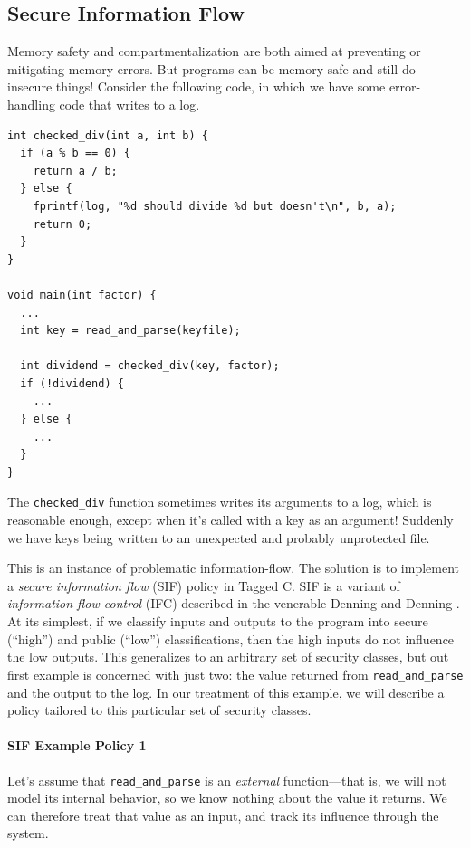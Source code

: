 \documentclass[acmsmall,review,anonymous]{acmart}\settopmatter{printfolios=true,printccs=false,printacmref=false}
\begin{document}
\subsection{Secure Information Flow}
\label{sec:SIF}

Memory safety and compartmentalization are both aimed at preventing or mitigating
memory errors. But programs can be memory safe and still do insecure things! Consider the
following code, in which we have some error-handling code that writes to a log.

\begin{verbatim}
int checked_div(int a, int b) {
  if (a % b == 0) {
    return a / b;
  } else {
    fprintf(log, "%d should divide %d but doesn't\n", b, a);
    return 0;
  }
}

void main(int factor) {
  ...
  int key = read_and_parse(keyfile);
  
  int dividend = checked_div(key, factor);
  if (!dividend) {
    ...
  } else {
    ...
  }
}
\end{verbatim}

The {\tt checked\_div} function sometimes writes its arguments to a log,
which is reasonable enough, except when it's called with a key as an argument!
Suddenly we have keys being written to an unexpected and probably unprotected file.

This is an instance of problematic information-flow. The solution is to implement
a {\em secure information flow} (SIF) policy in Tagged C. SIF is a variant of
{\em information flow control} (IFC) described in the venerable Denning and Denning
\cite{Denning77:SecureInformationFlow}. At its simplest, if we classify inputs and outputs to
the program into secure (``high'') and public (``low'') classifications, then the
high inputs do not influence the low outputs. This generalizes to an arbitrary set
of security classes, but out first example is concerned with just two: the value
returned from {\tt read\_and\_parse} and the output to the log.
In our treatment of this example, we will describe a policy tailored to this particular
set of security classes.

\paragraph*{SIF Example Policy 1}

Let's assume that {\tt read\_and\_parse} is an {\em external} function---that is, we will not
model its internal behavior, so we know nothing about the value it returns. We can therefore
treat that value as an input, and track its influence through the system.
\end{document}
